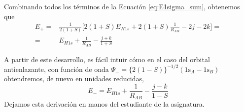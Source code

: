 \documentclass{tufte-handout}
\begin{document}
Combinando todos los términos de la Ecuación \ref{eq:E1sigma_sum}, obtenemos que 
\begin{equation}
\begin{split}
    E_{+}=&\frac{1}{2(1+S)}\bigg[
    2(1+S)E_{H1s} + 2(1+S)\frac{1}{R_{AB}}
    -2j -2k \bigg] = \\
    =&E_{H1s} + \frac{1}{R_{AB}}
    -\frac{j+k}{1+S}
\end{split}
\end{equation}

A partir de este desarrollo, es fácil intuir cómo en el caso del orbital antienlazante, con función de onda
$\Psi_- = \{2(1-S)\}^{-1/2}(\mathrm{1s}_A-\mathrm{1s}_B)$
obtendremos, de nuevo en unidades reducidas,
\begin{equation}
    E_{-}=E_{H1s} + \frac{1}{R_{AB}}
    -\frac{j-k}{1-S}
\end{equation}
Dejamos esta derivación en manos del estudiante de la asignatura.
\end{document}
